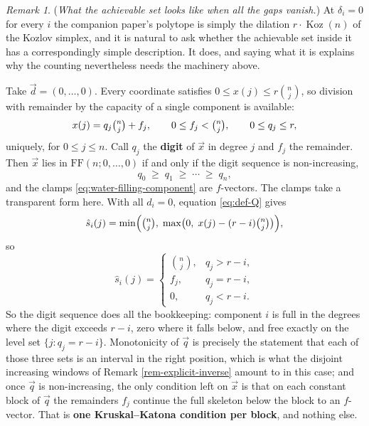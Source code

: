 \documentclass[11pt, a4paper, abstract=yes]{scrartcl}
\theoremstyle{definition}
\theoremstyle{remark}
\newtheorem{remark}[definition]{Remark}
\theoremstyle{plain}
\newcommand{\Koz}{\operatorname{Koz}}
\begin{document}
\begin{remark}
(\emph{What the achievable set looks like when all the gaps vanish.}) At \(\delta_i=0\) for every \(i\) the
companion paper's polytope is simply the dilation \(r\cdot\Koz(n)\) of the Kozlov simplex, and it is
natural to ask whether the achievable set inside it has a correspondingly simple description. It does,
and saying what it is explains why the counting nevertheless needs the machinery above.

Take \(\vec d=(0,\dots,0)\). Every coordinate satisfies \(0\le x(j)\le r\binom nj\), so division with
remainder by the capacity of a single component is available:
\begin{equation}\label{eq:delta0-digits}
  x(j)=q_j\tbinom nj+f_j,\qquad 0\le f_j<\tbinom nj,\qquad 0\le q_j\le r ,
\end{equation}
uniquely, for \(0\le j\le n\). Call \(q_j\) the \textbf{digit} of \(\vec x\) in degree \(j\) and \(f_j\) the
remainder. Then \(\vec x\) lies in \(\mathrm{FF}(n;0,\dots,0)\) if and only if the digit sequence is
non-increasing,
\begin{equation}\label{eq:delta0-characterisation}
  q_0\;\ge\;q_1\;\ge\;\cdots\;\ge\;q_n ,
\end{equation}
and the clamps \eqref{eq:water-filling-component} are \(f\)-vectors.
The clamps take a transparent form here. With all \(d_i=0\), equation \eqref{eq:def-Q} gives
\[
  \hat s_i(j)=\min\Bigl(\tbinom nj,\;\max\bigl(0,\;x(j)-(r-i)\tbinom nj\bigr)\Bigr),
\]
so
\begin{equation}\label{eq:delta0-clamp-digits}
  \hat s_i(j)=\begin{cases}
    \binom nj, & q_j>r-i,\\
    f_j,       & q_j=r-i,\\
    0,         & q_j<r-i .
  \end{cases}
\end{equation}
So the digit sequence does all the bookkeeping: component \(i\) is full in the degrees where the digit
exceeds \(r-i\), zero where it falls below, and free exactly on the level set \(\lbrace j:q_j=r-i\rbrace\).
Monotonicity of \(\vec q\) is precisely the statement that each of those three sets is an interval in
the right position, which is what the disjoint increasing windows of Remark \ref{rem-explicit-inverse}
amount to in this case; and once \(\vec q\) is non-increasing, the only condition left on \(\vec x\) is
that on each constant block of \(\vec q\) the remainders \(f_j\) continue the full skeleton below the
block to an \(f\)-vector. That is \textbf{one Kruskal--Katona condition per block}, and nothing else.


\end{remark}
\end{document}
